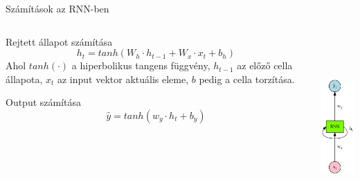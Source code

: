 \documentclass[english, aspectratio=169]{beamer}
\begin{document}
\begin{frame}{Számítások az RNN-ben}
\begin{columns}
\begin{column}{.5\textwidth}
\begin{block}{Rejtett állapot számítása}
\[
h_t = tanh\left(W_h \cdot h_{t-1} + W_x \cdot x_t + b_h\right)
\]
Ahol $tanh(\cdot)$ a hiperbolikus tangens függvény, $h_{t-1}$ az előző cella állapota, $x_t$ az input vektor aktuális eleme, $b$ pedig a cella torzítása.
\end{block}
\begin{block}{Output számítása}
\[
\hat{y} = tanh\left(w_y \cdot h_t + b_y\right)
\]
\end{block}
\end{column}
\begin{column}{.5\textwidth}
\begin{center}
\includegraphics[height=7cm, keepaspectratio]{graphs/recurrent_8.png}
\end{center}
\end{column}
\end{columns}
\end{frame}
\end{document}

